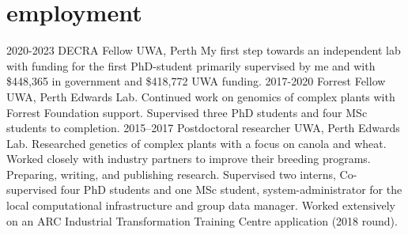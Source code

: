 \documentclass[]{friggeri-cv} %
\begin{document}
\section{employment}
\begin{entrylist}
\entry
{2020-2023}
{DECRA Fellow}
{UWA, Perth}
{My first step towards an independent lab with funding for the first PhD-student primarily supervised by me and with \$448,365 in government and \$418,772 UWA funding.}
\entry
{2017-2020}
{Forrest Fellow}
{UWA, Perth}
{Edwards Lab. Continued work on genomics of complex plants with Forrest Foundation support. Supervised three PhD students and four MSc students to completion.}
\entry
{2015--2017}
{Postdoctoral researcher}
{UWA, Perth}
{Edwards Lab. Researched genetics of complex plants with a focus on canola and wheat. Worked closely with industry partners to improve their breeding programs. Preparing, writing, and publishing research. Supervised two interns, Co-supervised four PhD students and one MSc student, system-administrator for the local computational infrastructure and group data manager. Worked extensively on an ARC Industrial Transformation Training Centre application (2018 round).}
\end{entrylist}

\end{document}
